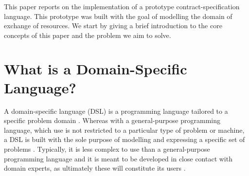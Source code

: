 \documentclass{ituthesis}
\begin{document}

%
This paper reports on the implementation of a prototype contract-specification language. This prototype was built with the goal of modelling the domain of exchange of resources. We start by giving a brief introduction to the core concepts of this paper and the problem we aim to solve.

\section{What is a Domain-Specific Language?}

A domain-specific language (DSL) is a programming language tailored to a specific problem domain \cite{whatsisadsl2005}. Whereas with a general-purpose programming language, which use is not restricted to a particular type of problem or machine, a DSL is built with the sole purpose of modelling and expressing a specific set of problems \cite{van2000domain}. %
Typically, it is less complex to use than a general-purpose programming language and it is meant to be developed in close contact with domain experts, as ultimately these will constitute its users \cite{dsl}.
\end{document}
